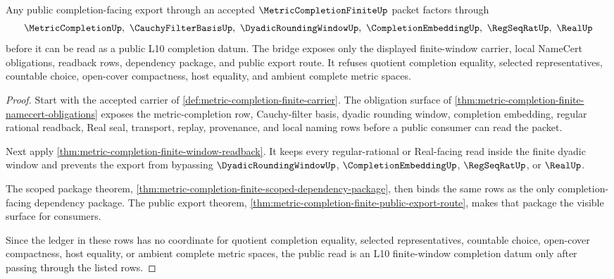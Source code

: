 \begin{theorem}
\label{thm:metric-completion-finite-l10-public-bridge}
Any public completion-facing export through an accepted $\MetricCompletionFiniteUp$ packet factors through
$$
\MetricCompletionUp,\ \CauchyFilterBasisUp,\ \DyadicRoundingWindowUp,\ \CompletionEmbeddingUp,\ \RegSeqRatUp,\ \RealUp
$$
before it can be read as a public L10 completion datum. The bridge exposes only the displayed finite-window carrier, local NameCert obligations, readback rows, dependency package, and public export route. It refuses quotient completion equality, selected representatives, countable choice, open-cover compactness, host equality, and ambient complete metric spaces.
\end{theorem}
\begin{proof}
Start with the accepted carrier of \autoref{def:metric-completion-finite-carrier}. The obligation surface of \autoref{thm:metric-completion-finite-namecert-obligations} exposes the metric-completion row, Cauchy-filter basis, dyadic rounding window, completion embedding, regular rational readback, Real seal, transport, replay, provenance, and local naming rows before a public consumer can read the packet.

Next apply \autoref{thm:metric-completion-finite-window-readback}. It keeps every regular-rational or Real-facing read inside the finite dyadic window and prevents the export from bypassing $\DyadicRoundingWindowUp$, $\CompletionEmbeddingUp$, $\RegSeqRatUp$, or $\RealUp$.

The scoped package theorem, \autoref{thm:metric-completion-finite-scoped-dependency-package}, then binds the same rows as the only completion-facing dependency package. The public export theorem, \autoref{thm:metric-completion-finite-public-export-route}, makes that package the visible surface for consumers.

Since the ledger in these rows has no coordinate for quotient completion equality, selected representatives, countable choice, open-cover compactness, host equality, or ambient complete metric spaces, the public read is an L10 finite-window completion datum only after passing through the listed rows.
\end{proof}

